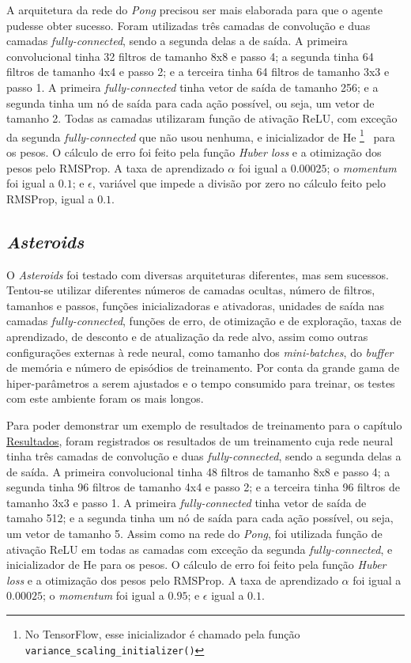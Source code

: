 A arquitetura da rede do \textit{Pong} precisou ser mais elaborada para que o agente pudesse obter sucesso.
Foram utilizadas três camadas de convolução e duas camadas \textit{fully-connected}, sendo a segunda delas a de saída.
A primeira convolucional tinha 32 filtros de tamanho 8x8 e passo 4; a segunda tinha 64 filtros de tamanho 4x4 e passo 2; e a terceira tinha 64 filtros de tamanho 3x3 e passo 1.
A primeira \textit{fully-connected} tinha vetor de saída de tamanho 256; e a segunda tinha um nó de saída para cada ação possível, ou seja, um vetor de tamanho 2.
Todas as camadas utilizaram função de ativação ReLU, com exceção da segunda \textit{fully-connected} que não usou nenhuma, e inicializador de He \footnote{No TensorFlow, esse inicializador é chamado pela função \texttt{variance\_scaling\_initializer()}}~\cite{DBLP:journals/corr/HeZR015} para os pesos.
O cálculo de erro foi feito pela função \textit{Huber loss} e a otimização dos pesos pelo RMSProp.
A taxa de aprendizado $\alpha$ foi igual a $0.00025$;
o \textit{momentum} foi igual a $0.1$;
e $\epsilon$, variável que impede a divisão por zero no cálculo feito pelo RMSProp, igual a $0.1$.

\subsection{\textit{Asteroids}}
\label{sec:arq_asteroids}

O \textit{Asteroids} foi testado com diversas arquiteturas diferentes, mas sem sucessos.
Tentou-se utilizar diferentes números de camadas ocultas, número de filtros, tamanhos e passos, funções inicializadoras e ativadoras, unidades de saída nas camadas \textit{fully-connected}, funções de erro, de otimização e de exploração, taxas de aprendizado, de desconto e de atualização da rede alvo, assim como outras configurações externas à rede neural, como tamanho dos \textit{mini-batches}, do \textit{buffer} de memória e número de episódios de treinamento.
Por conta da grande gama de hiper-parâmetros a serem ajustados e o tempo consumido para treinar, os testes com este ambiente foram os mais longos.

Para poder demonstrar um exemplo de resultados de treinamento para o capítulo \hyperref[cap:resultados]{Resultados}, foram registrados os resultados de um treinamento cuja rede neural tinha três camadas de convolução e duas \textit{fully-connected}, sendo a segunda delas a de saída.
A primeira convolucional tinha 48 filtros de tamanho 8x8 e passo 4; a segunda tinha 96 filtros de tamanho 4x4 e passo 2; e a terceira tinha 96 filtros de tamanho 3x3 e passo 1.
A primeira \textit{fully-connected} tinha vetor de saída de tamaho 512; e a segunda tinha um nó de saída para cada ação possível, ou seja, um vetor de tamanho 5.
Assim como na rede do \textit{Pong}, foi utilizada função de ativação ReLU em todas as camadas com exceção da segunda \textit{fully-connected}, e inicializador de He para os pesos.
O cálculo de erro foi feito pela função \textit{Huber loss} e a otimização dos pesos pelo RMSProp.
A taxa de aprendizado $\alpha$ foi igual a $0.00025$;
o \textit{momentum} foi igual a $0.95$;
e $\epsilon$ igual a $0.1$.

